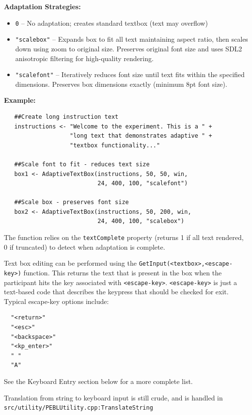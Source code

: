 \textbf{Adaptation Strategies:}
\begin{itemize}
\item \texttt{0} -- No adaptation; creates standard textbox (text may overflow)
\item \texttt{"scalebox"} -- Expands box to fit all text maintaining aspect ratio, then scales down using zoom to original size. Preserves original font size and uses SDL2 anisotropic filtering for high-quality rendering.
\item \texttt{"scalefont"} -- Iteratively reduces font size until text fits within the specified dimensions. Preserves box dimensions exactly (minimum 8pt font size).
\end{itemize}

\textbf{Example:}
\begin{verbatim}
   ##Create long instruction text
   instructions <- "Welcome to the experiment. This is a " +
                   "long text that demonstrates adaptive " +
                   "textbox functionality..."
   
   ##Scale font to fit - reduces text size
   box1 <- AdaptiveTextBox(instructions, 50, 50, win, 
                           24, 400, 100, "scalefont")
   
   ##Scale box - preserves font size
   box2 <- AdaptiveTextBox(instructions, 50, 200, win, 
                           24, 400, 100, "scalebox")
\end{verbatim}

The function relies on the \texttt{textComplete} property (returns 1 if all text rendered, 0 if truncated) to detect when adaptation is complete.




Text box editing can be performed using the \verb+GetInput(<textbox>,<escape-key>)+ function.  This returns the text that is present in the box when the participant hits the key associated with \verb+<escape-key>+.  
\verb+<escape-key>+ is just a text-based code that describes the keypress 
that should be checked for exit. Typical escape-key options include:
\begin{verbatim}
  "<return>"
  "<esc>"
  "<backspace>"
  "<kp_enter>"
  " "
  "A"
\end{verbatim}
 
See the Keyboard Entry section below for a more complete list.

Translation from string to keyboard input is still crude, 
and is handled in \texttt{src/utility/PEBLUtility.cpp:TranslateString} 

